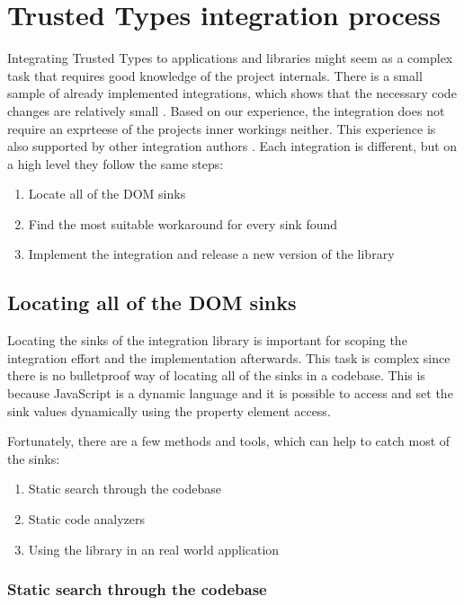 \chapter{Trusted Types integration process}
\label{tt_integration_setup}

Integrating Trusted Types to applications and libraries might seem as a complex task that requires
good knowledge of the project internals. There is a small sample of already implemented
integrations, which shows that the necessary code changes are relatively small
\cite{tt_integration_list}. Based on our experience, the integration does not require an exprteese
of the projects inner workings neither. This experience is also supported by other integration
authors \cite{tt_web_framework_paper}. Each integration is different, but on a high level they
follow the same steps:

\begin{enumerate}
  \item Locate all of the DOM sinks
  \item Find the most suitable workaround for every sink found
  \item Implement the integration and release a new version of the library
\end{enumerate}

\section{Locating all of the DOM sinks}

Locating the sinks of the integration library is important for scoping the integration effort and
the implementation afterwards. This task is complex since there is no bulletproof way of locating
all of the sinks in a codebase. This is because JavaScript is a dynamic language and it is possible
to access and set the sink values dynamically using the property element access.

Fortunately, there are a few methods and tools, which can help to catch most of the sinks:

\begin{enumerate}
  \item Static search through the codebase
  \item Static code analyzers
  \item Using the library in an real world application
\end{enumerate}

\subsection{Static search through the codebase}

